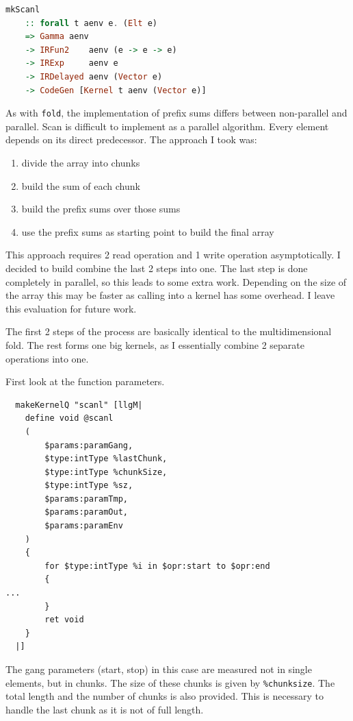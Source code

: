 \documentclass[a4paper,bibliography=totocnumbered,parskip,headsepline]{scrbook}
\begin{document}
\begin{lstlisting}[language=haskell]
mkScanl
    :: forall t aenv e. (Elt e)
    => Gamma aenv
    -> IRFun2    aenv (e -> e -> e)
    -> IRExp     aenv e
    -> IRDelayed aenv (Vector e)
    -> CodeGen [Kernel t aenv (Vector e)]
\end{lstlisting}

As with \lstinline[language=haskell]!fold!, the implementation of prefix sums differs between non-parallel and parallel.
Scan is difficult to implement as a parallel algorithm.
Every element depends on its direct predecessor.
The approach I took was:

\begin{enumerate}
\item divide the array into chunks
\item build the sum of each chunk
\item build the prefix sums over those sums
\item use the prefix sums as starting point to build the final array
\end{enumerate}

This approach requires 2 read operation and 1 write operation asymptotically.
I decided to build combine the last 2 steps into one.
The last step is done completely in parallel, so this leads to some extra work.
Depending on the size of the array this may be faster as calling into a kernel has some overhead.
I leave this evaluation for future work.

The first 2 steps of the process are basically identical to the multidimensional fold.
The rest forms one big kernels, as I essentially combine 2 separate operations into one.

First look at the function parameters.
\begin{lstlisting}
  makeKernelQ "scanl" [llgM|
    define void @scanl
    (
        $params:paramGang,
        $type:intType %lastChunk,
        $type:intType %chunkSize,
        $type:intType %sz,
        $params:paramTmp,
        $params:paramOut,
        $params:paramEnv
    )
    {
        for $type:intType %i in $opr:start to $opr:end
        {
...
        }
        ret void
    }
  |]
\end{lstlisting}
The gang parameters (start, stop) in this case are measured not in single elements, but in chunks.
The size of these chunks is given by \lstinline{%chunksize}.
The total length and the number of chunks is also provided.
This is necessary to handle the last chunk as it is not of full length.
\end{document}
